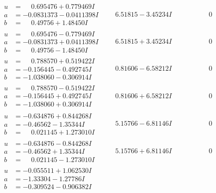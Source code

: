 \documentclass[1p]{elsarticle_modified}
\theoremstyle{definition}
\begin{document}
$$\begin{array}{c|c|c}
\begin{aligned}
u &= \phantom{-}0.695476 + 0.779469 I \\
a &= -0.0831373 - 0.0411398 I \\
b &= \phantom{-}0.49756 + 1.48450 I\end{aligned}
 & \phantom{-}6.51815 - 3.45234 I & \phantom{-0.000000 } 0 \\ \hline\begin{aligned}
u &= \phantom{-}0.695476 - 0.779469 I \\
a &= -0.0831373 + 0.0411398 I \\
b &= \phantom{-}0.49756 - 1.48450 I\end{aligned}
 & \phantom{-}6.51815 + 3.45234 I & \phantom{-0.000000 } 0 \\ \hline\begin{aligned}
u &= \phantom{-}0.788570 + 0.519422 I \\
a &= -0.156445 - 0.492745 I \\
b &= -1.038060 - 0.306914 I\end{aligned}
 & \phantom{-}0.81606 - 6.58212 I & \phantom{-0.000000 } 0 \\ \hline\begin{aligned}
u &= \phantom{-}0.788570 - 0.519422 I \\
a &= -0.156445 + 0.492745 I \\
b &= -1.038060 + 0.306914 I\end{aligned}
 & \phantom{-}0.81606 + 6.58212 I & \phantom{-0.000000 } 0 \\ \hline\begin{aligned}
u &= -0.634876 + 0.844268 I \\
a &= -0.46562 - 1.35344 I \\
b &= \phantom{-}0.021145 + 1.273010 I\end{aligned}
 & \phantom{-}5.15766 - 6.81146 I & \phantom{-0.000000 } 0 \\ \hline\begin{aligned}
u &= -0.634876 - 0.844268 I \\
a &= -0.46562 + 1.35344 I \\
b &= \phantom{-}0.021145 - 1.273010 I\end{aligned}
 & \phantom{-}5.15766 + 6.81146 I & \phantom{-0.000000 } 0 \\ \hline\begin{aligned}
u &= -0.055511 + 1.062530 I \\
a &= -1.33304 - 1.27786 I \\
b &= -0.309524 - 0.906382 I\end{aligned}

\end{array}$$
\end{document}
